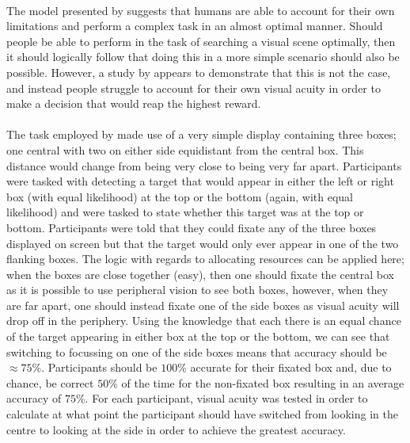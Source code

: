 \documentclass[12pt]{article}
\begin{document}
\paragraph{} The model presented by \cite{najemnik2005optimal} suggests that humans are able to account for their own limitations and perform a complex task in an almost optimal manner. Should people be able to perform in the task of searching a visual scene optimally, then it should logically follow that doing this in a more simple scenario should also be possible. However, a study by \cite{morvan2012human} appears to demonstrate that this is not the case, and instead people struggle to account for their own visual acuity in order to make a decision that would reap the highest reward. 

\paragraph{} The task employed by \cite{morvan2012human} made use of a very simple display containing three boxes; one central with two on either side equidistant from the central box. This distance would change from being very close to being very far apart. Participants were tasked with detecting a target that would appear in either the left or right box (with equal likelihood) at the top or the bottom (again, with equal likelihood) and were tasked to state whether this target was at the top or bottom. Participants were told that they could fixate any of the three boxes displayed on screen but that the target would only ever appear in one of the two flanking boxes. The logic with regards to allocating resources can be applied here; when the boxes are close together (easy), then one should fixate the central box as it is possible to use peripheral vision to see both boxes, however, when they are far apart, one should instead fixate one of the side boxes as visual acuity will drop off in the periphery. Using the knowledge that each there is an equal chance of the target appearing in either box at the top or the bottom, we can see that switching to focussing on one of the side boxes means that accuracy should be $\approx75\%$. Participants should be $100\%$ accurate for their fixated box and, due to chance, be correct $50\%$ of the time for the non-fixated box resulting in an average accuracy of $75\%$. For each participant, visual acuity was tested in order to calculate at what point the participant should have switched from looking in the centre to looking at the side in order to achieve the greatest accuracy.
\end{document}
